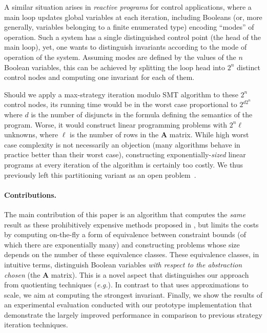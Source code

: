 \documentclass{llncs}
\newcommand{\rronly}[1]{#1}
\newcommand{\eg}{\textit{e.g.}}
\newcommand{\mat}[1]{{\boldsymbol #1}}
\begin{document}
A similar situation arises in
\emph{reactive programs} for control applications, where a main loop
updates global variables at each iteration, including Booleans\rronly{ (or,
more generally, variables belonging to a finite enumerated type)}
encoding ``modes'' of operation.
Such a system has a single distinguished control point (the head of
the main loop), yet, one wants to distinguish
invariants according to the mode of operation of the system.  Assuming
modes are defined by the values of the $n$ Boolean variables, this can
be achieved by splitting the loop head into $2^n$ distinct
control nodes and computing one invariant for each of them.  

Should we apply a max-strategy iteration modulo SMT algorithm
\cite{Gawlitza_Monniaux_LMCS12} to these $2^n$ control nodes, its
running time would be in the worst case proportional to $2^{d2^n}$
where $d$ is the number of disjuncts in the formula
defining the semantics of the program.  Worse, it would construct
linear programming problems with $2^n\ell$ unknowns, where $\ell$ is
the number of rows in the $\mat{A}$ matrix.
While high worst case complexity is not necessarily an objection (many
algorithms behave in practice better than their worst case),
constructing exponentially-\emph{sized} linear programs at every iteration of
the algorithm is certainly too costly. We thus previously left this partitioning
variant as an open problem~\cite[\S9]{Gawlitza_Monniaux_LMCS12}\cite[\S3.5]{DBLP:conf/vmcai/SchrammelS13}.

\paragraph{Contributions.}
The main contribution of this paper is an algorithm that computes the
\emph{same} result as these prohibitively expensive methods\rronly{ proposed in
\cite{GS07,Gawlitza_Monniaux_LMCS12}}, but limits the costs by
computing on-the-fly \rronly{a form of }equivalence between constraint bounds
(of which there are exponentially many) and constructing problems
whose size depends on the number of these equivalence classes. These
equivalence classes, in intuitive terms, distinguish Boolean variables
\emph{with respect to the abstraction chosen} (the $\mat{A}$
matrix). This is a novel aspect that distinguishes our approach from
quotienting techniques (\eg \cite{DBLP:journals/scp/BouajjaniFHR92}).
In contrast to \cite{DBLP:conf/vmcai/SchrammelS13} that uses
approximations to scale, we aim at computing the strongest invariant.
Finally, we show the results of an experimental evaluation conducted
with our prototype implementation that demonstrate the largely improved
performance in comparison to previous strategy iteration techniques.
\end{document}
